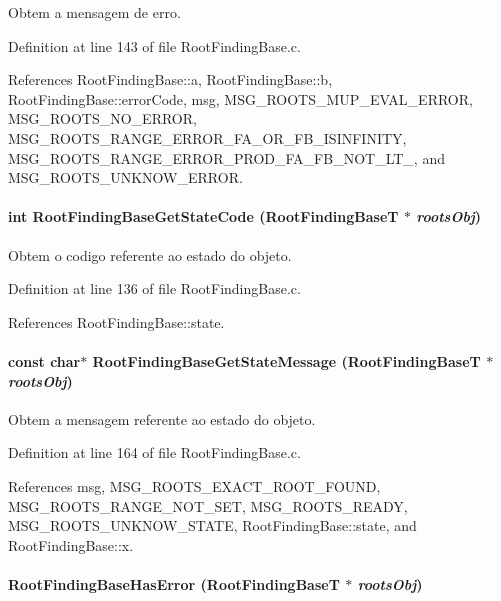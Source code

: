 Obtem a mensagem de erro. 



Definition at line 143 of file RootFindingBase.c.

References RootFindingBase::a, RootFindingBase::b, RootFindingBase::errorCode, msg, MSG\_\-ROOTS\_\-MUP\_\-EVAL\_\-ERROR, MSG\_\-ROOTS\_\-NO\_\-ERROR, MSG\_\-ROOTS\_\-RANGE\_\-ERROR\_\-FA\_\-OR\_\-FB\_\-ISINFINITY, MSG\_\-ROOTS\_\-RANGE\_\-ERROR\_\-PROD\_\-FA\_\-FB\_\-NOT\_\-LT\_, and MSG\_\-ROOTS\_\-UNKNOW\_\-ERROR.\hypertarget{group____roots_g1712b9a29b6e6b15df2195319d5f5d70}{
\paragraph[RootFindingBaseGetStateCode]{\setlength{\rightskip}{0pt plus 5cm}int RootFindingBaseGetStateCode ({\bf RootFindingBaseT} $\ast$ {\em rootsObj})}\hfill}
\label{group____roots_g1712b9a29b6e6b15df2195319d5f5d70}


Obtem o codigo referente ao estado do objeto. 



Definition at line 136 of file RootFindingBase.c.

References RootFindingBase::state.\hypertarget{group____roots_ga2434bfeb9592ff54df8601cd1a9a04d}{
\paragraph[RootFindingBaseGetStateMessage]{\setlength{\rightskip}{0pt plus 5cm}const char$\ast$ RootFindingBaseGetStateMessage ({\bf RootFindingBaseT} $\ast$ {\em rootsObj})}\hfill}
\label{group____roots_ga2434bfeb9592ff54df8601cd1a9a04d}


Obtem a mensagem referente ao estado do objeto. 



Definition at line 164 of file RootFindingBase.c.

References msg, MSG\_\-ROOTS\_\-EXACT\_\-ROOT\_\-FOUND, MSG\_\-ROOTS\_\-RANGE\_\-NOT\_\-SET, MSG\_\-ROOTS\_\-READY, MSG\_\-ROOTS\_\-UNKNOW\_\-STATE, RootFindingBase::state, and RootFindingBase::x.\hypertarget{group____roots_gec634820d94c4205729589fc44676b72}{
\paragraph[RootFindingBaseHasError]{ RootFindingBaseHasError ({\bf RootFindingBaseT} $\ast$ {\em rootsObj})}\hfill}
\label{group____roots_gec634820d94c4205729589fc44676b72}


